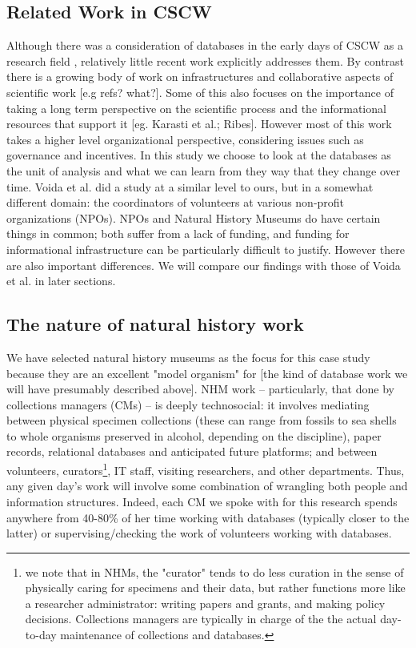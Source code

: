 \subsection{Related Work in CSCW}
Although there was a consideration of databases in the early days of CSCW as a research field   \cite{mariani1991impact}, relatively little recent work explicitly addresses them. By contrast there is a growing body of work on infrastructures and collaborative aspects of scientific work [e.g refs? what?]. Some of this also focuses  on the importance of taking a long term perspective on the scientific process and the informational resources that support it [eg. Karasti et al.; Ribes]. However most of this work takes a higher level organizational perspective, considering issues such as governance and incentives. In this study we choose to look at the databases as the unit of analysis and what we can learn from they way that they change over time.  Voida et al. did a study at a similar level to ours, but in a somewhat different domain:  the coordinators of volunteers at various non-profit organizations (NPOs). NPOs and Natural History Museums do have certain things in common; both suffer from a lack of funding, and  funding for informational infrastructure can be particularly difficult to justify. However there are also important differences. We will compare our findings with those of Voida et al. in later sections. 

\subsection{The nature of natural history work}

We have selected natural history museums as the focus for this case study because they are an excellent "model organism" for [the kind of database work we will have presumably described above]. NHM work -- particularly, that done by collections managers (CMs) -- is deeply technosocial: it involves mediating between physical specimen collections (these can range from fossils to sea shells to whole organisms preserved in alcohol, depending on the discipline), paper records, relational databases and anticipated future platforms; and between volunteers, curators\footnote{we note that in NHMs, the "curator" tends to do less curation in the sense of physically caring for specimens and their data, but rather functions more like a researcher administrator: writing papers and grants, and making policy decisions. Collections managers are typically in charge of the the actual day-to-day maintenance of collections and databases.}, IT staff, visiting researchers, and other departments. Thus, any given day’s work will involve some combination of wrangling both people and information structures. Indeed, each CM we spoke with for this research spends anywhere from 40-80\% of her time working with databases (typically closer to the latter) or supervising/checking the work of volunteers working with databases.


